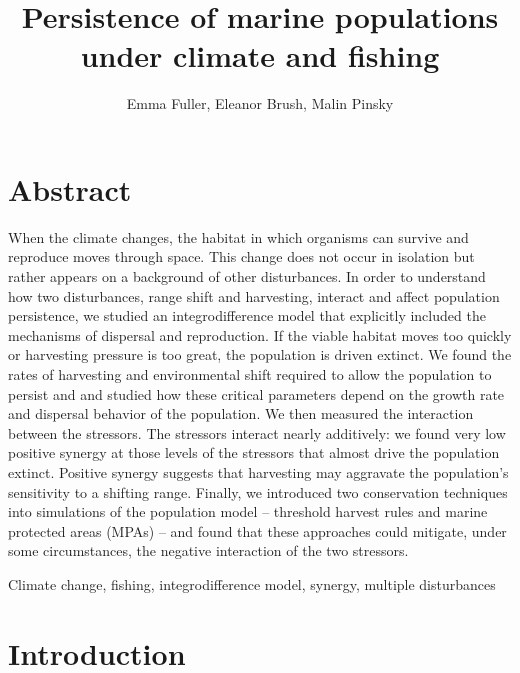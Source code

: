 \documentclass[12pt,english]{article}
\title{Persistence of marine populations under climate and fishing}
\author{Emma Fuller, Eleanor Brush, Malin Pinsky}
\date{}
\begin{document}
\maketitle

\begin{spacing}{1.9}
\begin{flushleft}

\section{Abstract}

When the climate changes, the habitat in which organisms can survive and reproduce moves through space. 
This change does not occur in isolation but rather appears on a background of other disturbances. 
In order to understand how two disturbances, range shift and harvesting, interact and affect population persistence, we studied an integrodifference model that explicitly included the mechanisms of dispersal and reproduction.  If the viable habitat moves too quickly or harvesting pressure is too great, the population is driven extinct.  We found the rates of harvesting and environmental shift required to allow the population to persist and and studied how these critical parameters depend on the growth rate and dispersal behavior of the population.  We then measured the interaction between the stressors.  The stressors interact nearly additively: we found very low positive synergy at those levels of the stressors that almost drive the population extinct.  Positive synergy suggests that harvesting may aggravate the population's sensitivity to a shifting range. Finally, we introduced two conservation techniques into simulations of the population model -- threshold harvest rules and marine protected areas (MPAs) -- and found that these approaches could mitigate, under some circumstances, the negative interaction of the two stressors.  
\hspace{10cm}

 Climate change, fishing, integrodifference model, synergy, multiple disturbances

\section{Introduction}


\end{flushleft}
\end{spacing}
\end{document}
